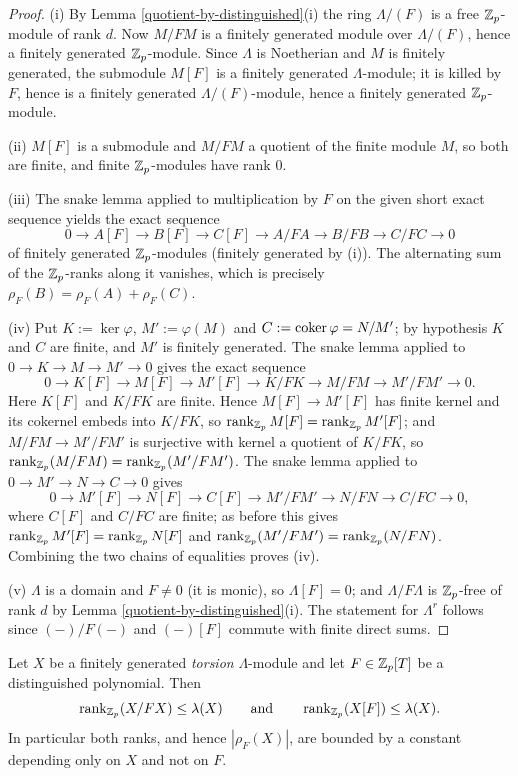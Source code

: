 \begin{proof}
\leanok
(i) By Lemma \ref{quotient-by-distinguished}(i) the ring $\Lambda/(F)$ is a free
${\mathbb {Z}}_p$-module of rank $d$.
Now $M/FM$ is a finitely generated module over $\Lambda/(F)$, hence a finitely
generated ${\mathbb {Z}}_p$-module.
Since $\Lambda$ is Noetherian and $M$ is finitely generated, the submodule $M[F]$
is a finitely generated $\Lambda$-module; it is killed by $F$, hence is a
finitely generated $\Lambda/(F)$-module, hence a finitely generated
${\mathbb {Z}}_p$-module.

(ii) $M[F]$ is a submodule and $M/FM$ a quotient of the finite module $M$, so
both are finite, and finite ${\mathbb {Z}}_p$-modules have rank $0$.

(iii) The snake lemma applied to multiplication by $F$ on the given short exact
sequence yields the exact sequence
$$0\to A[F]\to B[F]\to C[F]\to A/FA\to B/FB\to C/FC\to 0$$
of finitely generated ${\mathbb {Z}}_p$-modules (finitely generated by (i)).
The alternating sum of the ${\mathbb {Z}}_p$-ranks along it vanishes, which is precisely
$\rho_F(B)=\rho_F(A)+\rho_F(C)$.

(iv) Put $K:=\ker\varphi$, $M':=\varphi(M)$ and $C:=\operatorname{coker}\varphi=N/M'$; by
hypothesis $K$ and $C$ are finite, and $M'$ is finitely generated.
The snake lemma applied to $0\to K\to M\to M'\to 0$ gives the exact sequence
$$0\to K[F]\to M[F]\to M'[F]\to K/FK\to M/FM\to M'/FM'\to 0 .$$
Here $K[F]$ and $K/FK$ are finite.
Hence $M[F]\to M'[F]$ has finite kernel and its cokernel embeds into $K/FK$, so
$\operatorname{rank}_{{\mathbb {Z}}_p}M[F]=\operatorname{rank}_{{\mathbb {Z}}_p}M'[F]$; and $M/FM\to M'/FM'$ is surjective with
kernel a quotient of $K/FK$, so $\operatorname{rank}_{{\mathbb {Z}}_p}(M/FM)=\operatorname{rank}_{{\mathbb {Z}}_p}(M'/FM')$.
The snake lemma applied to $0\to M'\to N\to C\to 0$ gives
$$0\to M'[F]\to N[F]\to C[F]\to M'/FM'\to N/FN\to C/FC\to 0 ,$$
where $C[F]$ and $C/FC$ are finite; as before this gives
$\operatorname{rank}_{{\mathbb {Z}}_p}M'[F]=\operatorname{rank}_{{\mathbb {Z}}_p}N[F]$ and
$\operatorname{rank}_{{\mathbb {Z}}_p}(M'/FM')=\operatorname{rank}_{{\mathbb {Z}}_p}(N/FN)$.
Combining the two chains of equalities proves (iv).

(v) $\Lambda$ is a domain and $F\neq 0$ (it is monic), so $\Lambda[F]=0$; and
$\Lambda/F\Lambda$ is ${\mathbb {Z}}_p$-free of rank $d$ by
Lemma \ref{quotient-by-distinguished}(i).
The statement for $\Lambda^r$ follows since $(-)/F(-)$ and $(-)[F]$ commute with
finite direct sums.
\end{proof}

\begin{lem}
\label{torsion-rank-bounded}
Let $X$ be a finitely generated \emph{torsion} $\Lambda$-module and let
$F\in{\mathbb {Z}}_p[T]$ be a distinguished polynomial. Then
$$\operatorname{rank}_{{\mathbb {Z}}_p}(X/FX)\leq\lambda(X)\qquad\text{and}\qquad
\operatorname{rank}_{{\mathbb {Z}}_p}(X[F])\leq\lambda(X).$$
In particular both ranks, and hence $|\rho_F(X)|$, are bounded by a constant
depending only on $X$ and not on $F$.
\end{lem}

